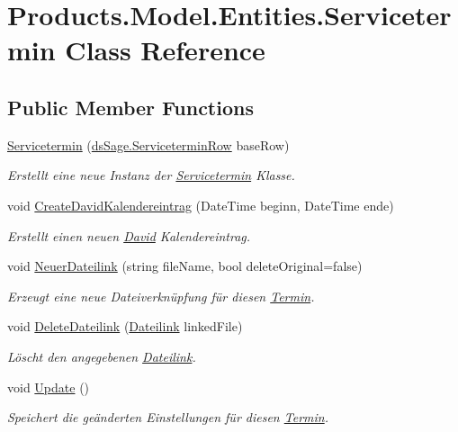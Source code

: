 \hypertarget{class_products_1_1_model_1_1_entities_1_1_servicetermin}{}\section{Products.\+Model.\+Entities.\+Servicetermin Class Reference}
\label{class_products_1_1_model_1_1_entities_1_1_servicetermin}
\subsection*{Public Member Functions}
\begin{DoxyCompactItemize}
\item 
\hyperlink{class_products_1_1_model_1_1_entities_1_1_servicetermin_a45bb01d5ba7579910e55db6b400e0ca2}{Servicetermin} (\hyperlink{class_products_1_1_data_1_1ds_sage_1_1_servicetermin_row}{ds\+Sage.\+Servicetermin\+Row} base\+Row)
\begin{DoxyCompactList}\small\item\em Erstellt eine neue Instanz der \hyperlink{class_products_1_1_model_1_1_entities_1_1_servicetermin}{Servicetermin} Klasse. \end{DoxyCompactList}\item 
void \hyperlink{class_products_1_1_model_1_1_entities_1_1_servicetermin_a0a2a397e253698e89b3501da125cd438}{Create\+David\+Kalendereintrag} (Date\+Time beginn, Date\+Time ende)
\begin{DoxyCompactList}\small\item\em Erstellt einen neuen \hyperlink{namespace_david}{David} Kalendereintrag. \end{DoxyCompactList}\item 
void \hyperlink{class_products_1_1_model_1_1_entities_1_1_servicetermin_a59ce52008817b6cc7d6525465681750e}{Neuer\+Dateilink} (string file\+Name, bool delete\+Original=false)
\begin{DoxyCompactList}\small\item\em Erzeugt eine neue Dateiverknüpfung für diesen \hyperlink{class_products_1_1_model_1_1_entities_1_1_termin}{Termin}. \end{DoxyCompactList}\item 
void \hyperlink{class_products_1_1_model_1_1_entities_1_1_servicetermin_aae4aff6c7a96b2be0cf77e4563a17c4a}{Delete\+Dateilink} (\hyperlink{class_products_1_1_model_1_1_entities_1_1_dateilink}{Dateilink} linked\+File)
\begin{DoxyCompactList}\small\item\em Löscht den angegebenen \hyperlink{class_products_1_1_model_1_1_entities_1_1_dateilink}{Dateilink}. \end{DoxyCompactList}\item 
void \hyperlink{class_products_1_1_model_1_1_entities_1_1_servicetermin_ad08a558d6b56fcc0238681e1ebfb94ff}{Update} ()
\begin{DoxyCompactList}\small\item\em Speichert die geänderten Einstellungen für diesen \hyperlink{class_products_1_1_model_1_1_entities_1_1_termin}{Termin}. \end{DoxyCompactList}\end{DoxyCompactItemize}

